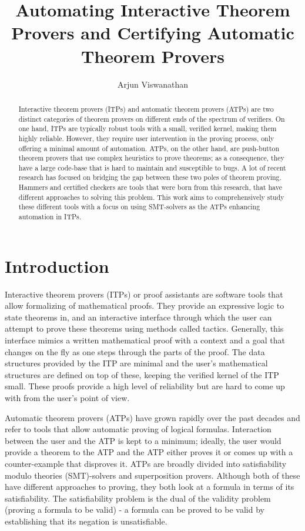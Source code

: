 \documentclass{article}
\begin{document}
\title{Automating Interactive Theorem Provers and Certifying Automatic Theorem Provers}
\author{Arjun Viswanathan}
\date{}
\maketitle
\begin{abstract}
	Interactive theorem provers (ITPs) and automatic theorem provers (ATPs)
	are two distinct categories of theorem provers on different ends 
	of the spectrum of verifiers. On one hand, 
	ITPs are typically robust tools with a small, verified kernel, 
	making them highly reliable. However, they 
	require user intervention in the proving process, only
	offering a minimal amount of automation. ATPs, on the other hand, 
	are push-button theorem provers that use complex heuristics to prove 
	theorems; as a consequence, they have a large code-base that is hard 
	to maintain and susceptible to bugs. A lot of recent research 
	has focused on bridging the gap between these two poles 
	of theorem proving. Hammers and certified checkers 
	are tools that were born from this research, that have different 
	approaches to solving this problem. This work aims to 
	comprehensively study these different tools 
	with a focus on using SMT-solvers as
	the ATPs enhancing automation in ITPs.
\end{abstract}

\section{Introduction}
\label{sec:intro}
	Interactive theorem provers (ITPs) or proof assistants are 
	software tools that allow formalizing of mathematical proofs.
	They provide an expressive logic to state theorems in, and 
	an interactive interface through which the user can 
	attempt to prove these theorems using methods 
	called tactics. Generally, this interface mimics a 
	written mathematical proof with a context and a goal 
	that changes on the fly as one steps through the parts 
	of the proof. The data structures provided by the ITP are 
	minimal and the user's mathematical structures are 
	defined on top of these, keeping the verified kernel of the 
	ITP small. These proofs provide a high level of reliability
	but are hard to come up with from the user's point of view. 
	
	Automatic theorem provers (ATPs) have grown rapidly over the 
	past decades and refer to tools that allow automatic proving 
	of logical formulas. Interaction between the user and the 
	ATP is kept to a minimum; ideally, the user would provide a 
	theorem to the ATP and the ATP either proves it or comes up
	with a counter-example that disproves it. ATPs are broadly divided into satisfiability modulo theories 
	(SMT)-solvers and superposition provers. Although both 
	of these have different approaches to proving, they 
	both look at a formula in terms of its satisfiability. 
	The satisfiability problem is the dual of the validity
	problem (proving a formula to be valid) - a formula can 
	be proved to be valid by establishing that its negation 
	is unsatisfiable.
	
\end{document}

